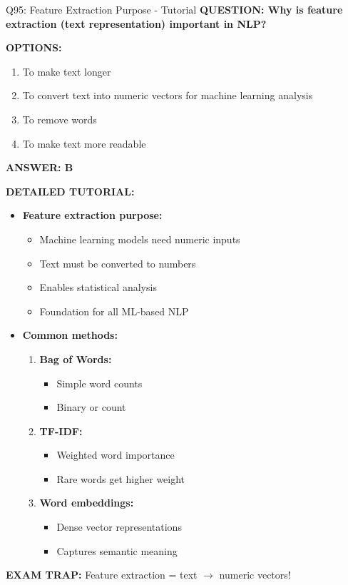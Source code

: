 \documentclass[8pt]{beamer}
\begin{document}
	\begin{frame}{Q95: Feature Extraction Purpose - Tutorial}
		\fontsize{6.5}{7.5}\selectfont
		\textbf{QUESTION: Why is feature extraction (text representation) important in NLP?}
		
		\vspace{0.1cm}
		\textbf{OPTIONS:}
		\begin{enumerate}
			\item To make text longer
			\item To convert text into numeric vectors for machine learning analysis
			\item To remove words
			\item To make text more readable
		\end{enumerate}
		
		\vspace{0.1cm}
		\textcolor{myblue}{\textbf{ANSWER: B}}
		
		\vspace{0.1cm}
		\textbf{DETAILED TUTORIAL:}
		\begin{itemize}
			\item \textbf{Feature extraction purpose:}
			\begin{itemize}
				\item Machine learning models need numeric inputs
				\item Text must be converted to numbers
				\item Enables statistical analysis
				\item Foundation for all ML-based NLP
			\end{itemize}
			\item \textbf{Common methods:}
			\begin{enumerate}
				\item \textbf{Bag of Words:}
				\begin{itemize}
					\item Simple word counts
					\item Binary or count
				\end{itemize}
				\item \textbf{TF-IDF:}
				\begin{itemize}
					\item Weighted word importance
					\item Rare words get higher weight
				\end{itemize}
				\item \textbf{Word embeddings:}
				\begin{itemize}
					\item Dense vector representations
					\item Captures semantic meaning
				\end{itemize}
			\end{enumerate}
		\end{itemize}
		
		\textcolor{myred}{\textbf{EXAM TRAP:}} Feature extraction = \textcolor{myblue}{text $\to$ numeric vectors}!
	\end{frame}
	
\end{document}
